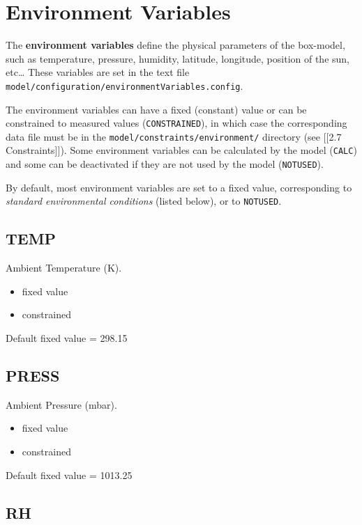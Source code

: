 \section{Environment Variables} \label{sec:environment}

The \textbf{environment variables} define the physical parameters of the
box-model, such as temperature, pressure, humidity, latitude, longitude,
position of the sun, etc\ldots{} These variables are set in the text
file \texttt{model/configuration/environmentVariables.config}.

The environment variables can have a fixed (constant) value or can be
constrained to measured values (\texttt{CONSTRAINED}), in which case the
corresponding data file must be in the
\texttt{model/constraints/environment/} directory (see {[}{[}2.7
Constraints{]}{]}). Some environment variables can be calculated by the
model (\texttt{CALC}) and some can be deactivated if they are not used
by the model (\texttt{NOTUSED}).

By default, most environment variables are set to a fixed value,
corresponding to \emph{standard environmental conditions} (listed
below), or to \texttt{NOTUSED}.

\subsection{TEMP}\label{temp}

Ambient Temperature (K).

\begin{itemize}
\item
  fixed value
\item
  constrained
\end{itemize}

Default fixed value = 298.15

\subsection{PRESS}\label{press}

Ambient Pressure (mbar).

\begin{itemize}
\item
  fixed value
\item
  constrained
\end{itemize}

Default fixed value = 1013.25

\subsection{RH}\label{rh}

